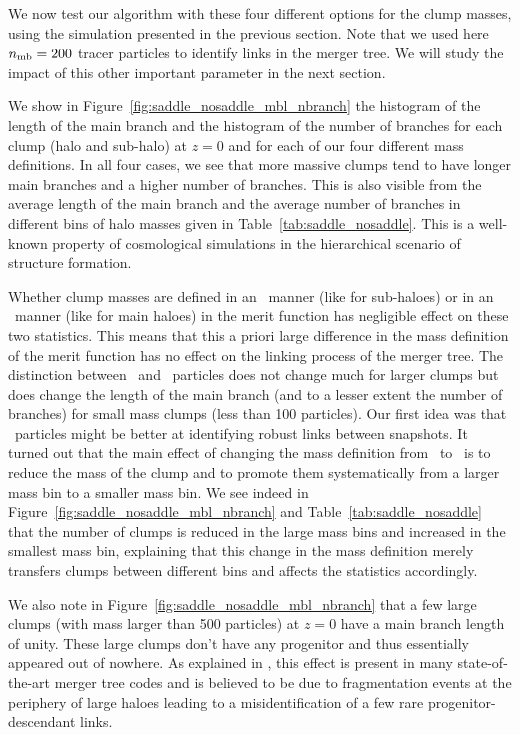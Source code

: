 

We now test our algorithm with these four different options for the clump
masses, using the simulation presented in the previous section. Note
that we used here $n_{\rm mb}=200$ tracer particles to identify links
in the merger tree. We will study the impact of this other important
parameter in the next section.

We show in Figure~\ref{fig:saddle_nosaddle_mbl_nbranch} the histogram
of the length of the main branch and the histogram of the number of
branches for each clump (halo and sub-halo) at $z=0$ and for each of
our four different mass definitions. In all four cases, we see that more
massive clumps tend to have longer main branches and a higher number
of branches.  This is also visible from the average length of the main
branch and the average number of branches in different bins of halo
masses given in Table~\ref{tab:saddle_nosaddle}. This is a well-known
property of cosmological simulations in the hierarchical scenario of
structure formation.

Whether clump masses are defined in an \exc\ manner (like for
sub-haloes) or in an \inc\ manner (like for main haloes) in the merit
function has negligible effect on these two statistics. This means
that this a priori large difference in the mass definition of the
merit function has no effect on the linking process of the merger
tree.  The distinction between \sad\ and \nosad\ particles does not
change much for larger clumps but does change the length of the main
branch (and to a lesser extent the number of branches) for small mass
clumps (less than 100 particles). Our first idea was that
\sad\ particles might be better at identifying robust links between
snapshots. It turned out that the main effect of changing the mass
definition from \nosad\ to \sad\ is to reduce the mass of the clump and
to promote them systematically from a larger mass bin to a smaller
mass bin. We see indeed in
Figure~\ref{fig:saddle_nosaddle_mbl_nbranch} and
Table~\ref{tab:saddle_nosaddle} that the number of clumps is reduced
in the large mass bins and increased in the smallest mass bin,
explaining that this change in the mass definition merely transfers clumps
between different bins and affects the statistics accordingly.

We also note in Figure~\ref{fig:saddle_nosaddle_mbl_nbranch} that a few 
large clumps (with mass larger than 500 particles) at $z=0$ have a
main branch length of unity.  These large clumps don't have any
progenitor and thus essentially appeared out of nowhere. As explained
in \citet{SUSSING_COMPARISON}, this effect is present in many
state-of-the-art merger tree codes and is believed to be due to
fragmentation events at the periphery of large haloes leading to a
misidentification of a few rare progenitor-descendant links.

